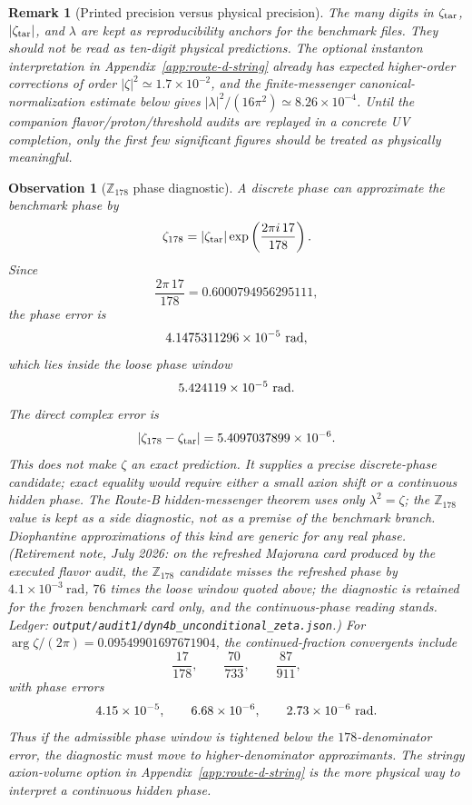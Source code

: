 \documentclass[
  aps,
  prd,
  preprint,
  nofootinbib,
  superscriptaddress,
  longbibliography
]{revtex4-2}
\newtheorem{observation}[theorem]{Observation}
\newtheorem{remark}[theorem]{Remark}
\begin{document}
\begin{remark}[Printed precision versus physical precision]
The many digits in \(\zeta_{\rm tar}\), \(|\zeta_{\rm tar}|\), and
\(\lambda\) are kept as reproducibility anchors for the benchmark files.  They
should not be read as ten-digit physical predictions.  The optional
instanton interpretation in Appendix~\ref{app:route-d-string} already has
expected higher-order corrections of order \(|\zeta|^2\simeq1.7\times10^{-2}\),
and the finite-messenger canonical-normalization estimate below gives
\(|\lambda|^2/(16\pi^2)\simeq8.26\times10^{-4}\).  Until the companion
flavor/proton/threshold audits are replayed in a concrete UV completion, only
the first few significant figures should be treated as physically meaningful.
\end{remark}

\begin{observation}[\(\mathbb Z_{178}\) phase diagnostic]
A discrete phase can approximate the benchmark phase by
\[
  \zeta_{178}
  =
  |\zeta_{\rm tar}|\exp\left(\frac{2\pi i\,17}{178}\right).
\]
Since
\[
  \frac{2\pi\,17}{178}=0.6000794956295111,
\]
the phase error is
\[
  4.1475311296\times10^{-5}\ {\rm rad},
\]
which lies inside the loose phase window
\[
  5.424119\times10^{-5}\ {\rm rad}.
\]
The direct complex error is
\[
  |\zeta_{178}-\zeta_{\rm tar}|
  =
  5.4097037899\times10^{-6}.
\]
This does not make \(\zeta\) an exact prediction.  It supplies a precise
discrete-phase candidate; exact equality would require either a small axion
shift or a continuous hidden phase.  The Route-B hidden-messenger theorem uses
only \(\lambda^2=\zeta\); the \(\mathbb Z_{178}\) value is kept as a side
diagnostic, not as a premise of the benchmark branch.  Diophantine
approximations of this kind are generic for any real phase.
(Retirement note, July 2026: on the refreshed Majorana card produced by
the executed flavor audit, the \(\mathbb Z_{178}\) candidate misses the
refreshed phase by \(4.1\times10^{-3}\ \mathrm{rad}\), \(76\) times the
loose window quoted above; the diagnostic is retained for the frozen
benchmark card only, and the continuous-phase reading stands.  Ledger:
\texttt{output/audit1/dyn4b\_unconditional\_zeta.json}.)  For
\(\arg\zeta/(2\pi)=0.09549901697671904\), the continued-fraction convergents
include
\[
  \frac{17}{178},\qquad \frac{70}{733},\qquad \frac{87}{911},
\]
with phase errors
\[
  4.15\times10^{-5},\qquad 6.68\times10^{-6},\qquad
  2.73\times10^{-6}\ {\rm rad}.
\]
Thus if the admissible phase window is tightened below the \(178\)-denominator
error, the diagnostic must move to higher-denominator approximants.  The
stringy axion-volume option in Appendix~\ref{app:route-d-string} is the more
physical way to interpret a continuous hidden phase.
\end{observation}
\end{document}
